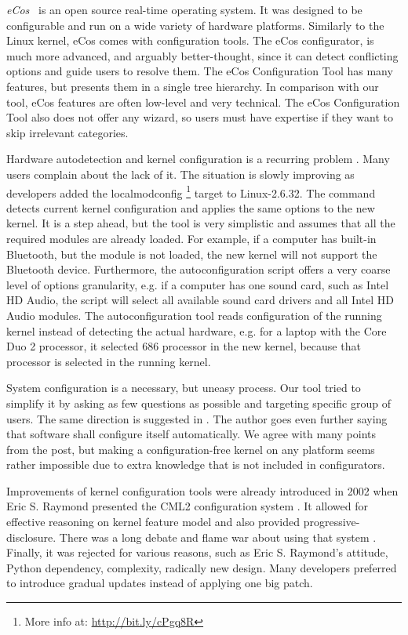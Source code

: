 \documentclass{chi2009}
\begin{document}
\textit{eCos}~\cite{veer:ecos:2000} is an open source real-time operating system. It was designed to be configurable and run on a wide variety of hardware platforms. Similarly to the Linux kernel, eCos comes with configuration tools. The eCos configurator, is much more advanced, and arguably better-thought, since it can detect conflicting options and guide users to resolve them. The eCos Configuration Tool has many features, but presents them in a single tree hierarchy. In comparison with our tool, eCos features are often low-level and very technical. The eCos Configuration Tool also does not offer any wizard, so users must have expertise if they want to skip irrelevant categories.

Hardware autodetection and kernel configuration is a recurring problem \cite{debian:config:2010,soft32:config:2007}. Many users complain about the lack of it. The situation is slowly improving as developers added the \textsf{localmodconfig} \footnote{More info at: \url{http://bit.ly/cPgq8R}} target to Linux-2.6.32. The command detects current kernel configuration and applies the same options to the new kernel. It is a step ahead, but the tool is very simplistic and assumes that all the required modules are already loaded. For example, if a computer has built-in Bluetooth, but the module is not loaded, the new kernel will not support the Bluetooth device. Furthermore, the autoconfiguration script offers a very coarse level of options granularity, e.g. if a computer has one sound card, such as Intel HD Audio, the script will select all available sound card drivers and all Intel HD Audio modules. The autoconfiguration tool reads configuration of the running kernel instead of detecting the actual hardware, e.g. for a laptop with the Core Duo 2 processor, it selected 686 processor in the new kernel, because that processor is selected in the running kernel.

System configuration is a necessary, but uneasy process. Our tool tried to simplify it by asking as few questions as possible and targeting specific group of users. The same direction is suggested in \cite{spillers:config:2010}. The author goes even further saying that software shall configure itself automatically. We agree with many points from the post, but making a configuration-free kernel on any platform seems rather impossible due to extra knowledge that is not included in configurators.

Improvements of kernel configuration tools were already introduced in 2002 when Eric S. Raymond presented the CML2 configuration system \cite{raymond:cml2:2000}. It allowed for effective reasoning on kernel feature model and also provided progressive-disclosure. There was a long debate and flame war about using that system \cite{kerneltrap:linux:2002}. Finally, it was rejected for various reasons, such as Eric S. Raymond's attitude, Python dependency, complexity, radically new design. Many developers preferred to introduce gradual updates instead of applying one big patch.
\end{document}
